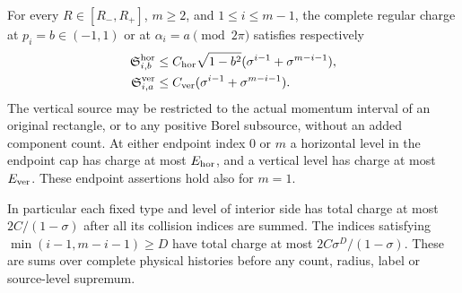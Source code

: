 \begin{theorem}
\label{thm:cs-charge}
For every $R\in[R_-,R_+]$, $m\ge2$, and $1\le i\le m-1$,
the complete regular charge at $p_i=b\in(-1,1)$ or at
$\alpha_i=a\pmod{2\pi}$ satisfies respectively
\begin{align}
 \mathfrak S^{\rm hor}_{i,b}
    &\le C_{\rm hor}\sqrt{1-b^2}
                         (\sigma^{i-1}+\sigma^{m-i-1}),
                                                        \label{eq:cs-charge-h}\\
 \mathfrak S^{\rm ver}_{i,a}
    &\le C_{\rm ver}(\sigma^{i-1}+\sigma^{m-i-1}).
                                                        \label{eq:cs-charge-v}
\end{align}
The vertical source may be restricted to the actual momentum interval
of an original rectangle, or to any positive Borel subsource, without
an added component count.  At either endpoint index $0$ or $m$ a
horizontal level in the endpoint cap has charge at most
$E_{\rm hor}$, and a vertical level has charge at most $E_{\rm ver}$.
These endpoint assertions hold also for $m=1$.

In particular each fixed type and level of interior side has total
charge at most $2C/(1-\sigma)$ after all its collision indices are
summed.  The indices satisfying
$\min(i-1,m-i-1)\ge D$ have total charge at most
$2C\sigma^D/(1-\sigma)$.  These are sums over complete physical
histories before any count, radius, label or source-level supremum.
\end{theorem}
